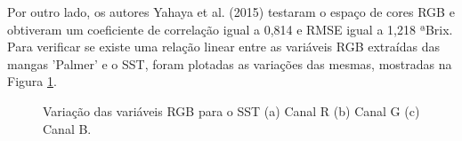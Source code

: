 Por outro lado, os autores Yahaya et al. (2015) testaram o espaço de cores RGB e obtiveram um coeficiente de correlação igual a 0,814 e RMSE igual a 1,218 ªBrix. Para verificar se existe uma relação linear entre as variáveis RGB extraídas das mangas 'Palmer' e o SST, foram plotadas as variações das mesmas, mostradas na Figura \ref{fig:rgb_sst}.

\begin{figure}[H]
\centering
    \caption{\label{fig:rgb_sst} Variação das variáveis RGB para o SST (a) Canal R (b) Canal G (c) Canal B.}

\end{figure}
